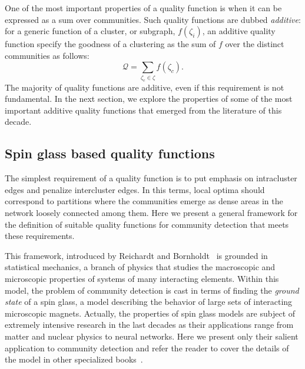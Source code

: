 One of the most important properties of a quality function is when it can be expressed as a sum over communities. Such quality functions are dubbed \emph{additive}: for a generic function of a cluster, or subgraph, $f(\zeta_i)$, an additive quality function specify the goodness of a clustering as the sum of $f$ over the distinct communities as follows:
\begin{equation}\label{eq:additive_quality}
\mathcal{Q} = \sum \limits_{\zeta_c \in \zeta} f(\zeta_c).
\end{equation}
The majority of quality functions are additive, even if this requirement is not fundamental. In the next section, we explore the properties of some of the most important additive quality functions that emerged from the literature of this decade.

\subsection{Spin glass based quality functions}
The simplest requirement of a quality function is to put emphasis on intracluster edges and penalize intercluster edges. In this terms, local optima should correspond to partitions where the communities emerge as dense areas in the network loosely connected among them.
Here we present a general framework for the definition of suitable quality functions for community detection that meets these requirements.

This framework, introduced by Reichardt and Bornholdt~\cite{reichardt2006} is grounded in statistical mechanics, a branch of physics that studies the macroscopic and microscopic properties of systems of many interacting elements. Within this model, the problem of community detection is cast in terms of finding the \emph{ground state} of a spin glass, a model describing the behavior of large sets of interacting microscopic magnets.
Actually, the properties of spin glass models are subject of extremely intensive research in the last decades as their applications range from matter and nuclear physics to neural networks. Here we present only their salient application to community detection and refer the reader to cover the details of the model in other specialized books~\cite{mezard1990}.

